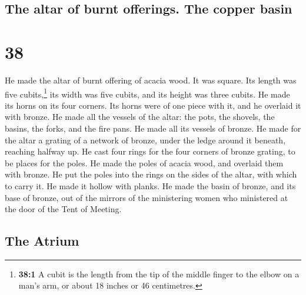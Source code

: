 \hypertarget{the-altar-of-burnt-offerings.-the-copper-basin}{%
\subsection{The altar of burnt offerings. The copper
basin}\label{the-altar-of-burnt-offerings.-the-copper-basin}}

\hypertarget{section-37}{%
\section{38}\label{section-37}}

 He made the altar of burnt offering of acacia wood. It
was square. Its length was five cubits,\footnote{\textbf{38:1} A cubit
  is the length from the tip of the middle finger to the elbow on a
  man's arm, or about 18 inches or 46 centimetres.} its width was five
cubits, and its height was three cubits.  He made its
horns on its four corners. Its horns were of one piece with it, and he
overlaid it with bronze.  He made all the vessels of the
altar: the pots, the shovels, the basins, the forks, and the fire pans.
He made all its vessels of bronze.  He made for the altar
a grating of a network of bronze, under the ledge around it beneath,
reaching halfway up.  He cast four rings for the four
corners of bronze grating, to be places for the poles.  He
made the poles of acacia wood, and overlaid them with bronze.
 He put the poles into the rings on the sides of the
altar, with which to carry it. He made it hollow with planks.
 He made the basin of bronze, and its base of bronze, out
of the mirrors of the ministering women who ministered at the door of
the Tent of Meeting.

\hypertarget{the-atrium}{%
\subsection{The Atrium}\label{the-atrium}}

